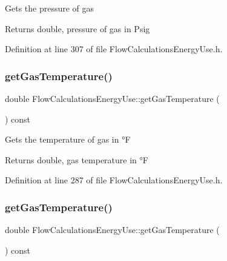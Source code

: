 Gets the pressure of gas

\begin{DoxyReturn}{Returns}
double, pressure of gas in Psig 
\end{DoxyReturn}


Definition at line 307 of file Flow\+Calculations\+Energy\+Use.\+h.

\mbox{\label{class_flow_calculations_energy_use_a9d5782d594530c0345ac3c8faff252b3}} 
\subsubsection{\texorpdfstring{get\+Gas\+Temperature()}{getGasTemperature()}\hspace{0.1cm}{\footnotesize\ttfamily [1/3]}}
{\footnotesize\ttfamily double Flow\+Calculations\+Energy\+Use\+::get\+Gas\+Temperature (\begin{DoxyParamCaption}{ }\end{DoxyParamCaption}) const\hspace{0.3cm}{\ttfamily [inline]}}

Gets the temperature of gas in °F

\begin{DoxyReturn}{Returns}
double, gas temperature in °F 
\end{DoxyReturn}


Definition at line 287 of file Flow\+Calculations\+Energy\+Use.\+h.

\mbox{\label{class_flow_calculations_energy_use_a9d5782d594530c0345ac3c8faff252b3}} 
\subsubsection{\texorpdfstring{get\+Gas\+Temperature()}{getGasTemperature()}\hspace{0.1cm}{\footnotesize\ttfamily [2/3]}}
{\footnotesize\ttfamily double Flow\+Calculations\+Energy\+Use\+::get\+Gas\+Temperature (\begin{DoxyParamCaption}{ }\end{DoxyParamCaption}) const\hspace{0.3cm}{\ttfamily [inline]}}

